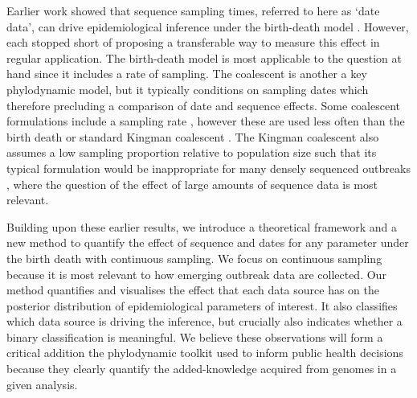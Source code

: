 \documentclass{article}
\begin{document}
Earlier work showed that sequence sampling times, referred to here as `date data', can drive epidemiological inference under the birth-death model \citep{volz_sampling_2014, boskova2018influence, Featherstone2021Infectious}. However, each stopped short of proposing a transferable way to measure this effect in regular application. The birth-death model is most applicable to the question at hand since it includes a rate of sampling. The coalescent is another a key phylodynamic model, but it typically conditions on sampling dates which therefore precluding a comparison of date and sequence effects. Some coalescent formulations include a sampling rate \citep{volz_sampling_2014}, however these are used less often than the birth death or standard Kingman coalescent \citep{kingman1977note}. The Kingman coalescent also assumes a low sampling proportion relative to population size such that its typical formulation would be inappropriate for many densely sequenced outbreaks \citep{boskova2018influence}, where the question of the effect of large amounts of sequence data is most relevant.

Building upon these earlier results, we introduce a theoretical framework and a new method to quantify the effect of sequence and dates for any parameter under the birth death with continuous sampling. We focus on continuous sampling because it is most relevant to how emerging outbreak data are collected. Our method quantifies and visualises the effect that each data source has on the posterior distribution of epidemiological parameters of interest. It also classifies which data source is driving the inference, but crucially also indicates whether  a binary classification is meaningful. We believe these observations will form a critical addition the phylodynamic toolkit used to inform public health decisions because they clearly quantify the added-knowledge acquired from genomes in a given analysis.

\end{document}
